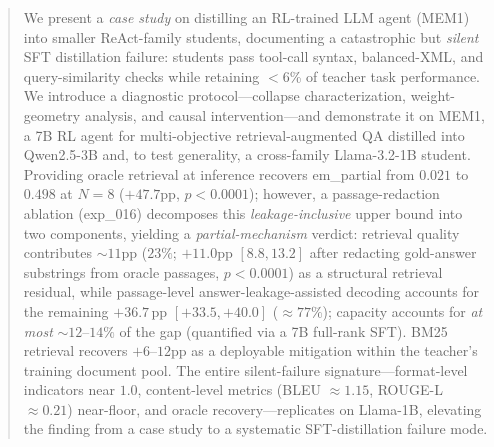 \begin{abstract}
We present a \emph{case study} on distilling an RL-trained LLM agent (MEM1) into smaller ReAct-family students, documenting a catastrophic but \emph{silent} SFT distillation failure: students pass tool-call syntax, balanced-XML, and query-similarity checks while retaining $<$6\% of teacher task performance. We introduce a diagnostic protocol---collapse characterization, weight-geometry analysis, and causal intervention---and demonstrate it on MEM1, a 7B RL agent for multi-objective retrieval-augmented QA distilled into Qwen2.5-3B and, to test generality, a cross-family Llama-3.2-1B student. Providing oracle retrieval at inference recovers em\_partial from $0.021$ to $0.498$ at $N\!=\!8$ ($+47.7$pp, $p < 0.0001$); however, a passage-redaction ablation (exp\_016) decomposes this \emph{leakage-inclusive} upper bound into two components, yielding a \emph{partial-mechanism} verdict: retrieval quality contributes ${\sim}11$pp ($23\%$; $+11.0$pp $[8.8,13.2]$ after redacting gold-answer substrings from oracle passages, $p<0.0001$) as a structural retrieval residual, while passage-level answer-leakage-assisted decoding accounts for the remaining $+36.7$\,pp $[+33.5, +40.0]$ ($\approx 77\%$); capacity accounts for \emph{at most} ${\sim}12$--$14\%$ of the gap (quantified via a 7B full-rank SFT). BM25 retrieval recovers $+6$--$12$pp as a deployable mitigation within the teacher's training document pool. The entire silent-failure signature---format-level indicators near $1.0$, content-level metrics (BLEU $\approx 1.15$, ROUGE-L $\approx 0.21$) near-floor, and oracle recovery---replicates on Llama-1B, elevating the finding from a case study to a systematic SFT-distillation failure mode.
\end{abstract}
